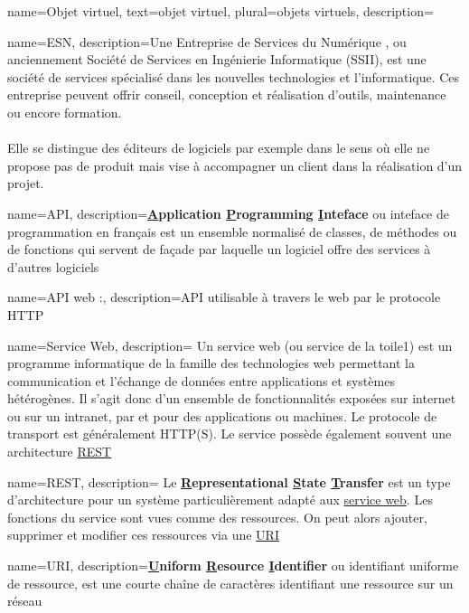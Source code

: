 {
    name=Objet virtuel,
    text=objet virtuel,
    plural=objets virtuels,
    description={}
}

{
	name=ESN,
    description={Une Entreprise de Services du Numérique , ou anciennement Société de Services en Ingénierie Informatique (SSII), est une société de services spécialisé dans les nouvelles technologies et l’informatique. Ces entreprise peuvent offrir conseil, conception et réalisation d’outils, maintenance ou encore formation.\\\\
    Elle se distingue des éditeurs de logiciels par exemple dans le sens où elle ne propose pas de produit mais vise à accompagner un client dans la réalisation d'un projet.}
}

{
    name=API,
    description={\textbf{\underline{A}pplication \underline{P}rogramming \underline{I}nteface} ou inteface de programmation en français est un ensemble normalisé de classes, de méthodes ou de fonctions qui servent de façade par laquelle un logiciel offre des services à d'autres logiciels}
}

{
    name=API web :,
    description={\gls{API} utilisable à travers le web par le protocole HTTP}
}

{
    name=Service Web,
    description=
    {
        Un service web (ou service de la toile1) est un programme informatique de la famille des technologies web permettant la communication et l'échange de données entre applications et systèmes hétérogènes.
        Il s'agit donc d'un ensemble de fonctionnalités exposées sur internet ou sur un intranet, par et pour des applications ou machines.
        Le protocole de transport est généralement HTTP(S). Le service possède également souvent une architecture \underline{\gls{REST}}
    }
}

{
    name=REST,
    description=
    {
        Le \textbf{\underline{R}epresentational \underline{S}tate \underline{T}ransfer} est un type d'architecture pour un système particulièrement adapté aux \underline{\gls{service web}}. Les fonctions du service sont vues comme des ressources. On peut alors ajouter, supprimer et modifier ces ressources via une \underline{\gls{URI}}
    }
}

{
    name=URI,
    description={\textbf{\underline{U}niform \underline{R}esource \underline{I}dentifier} ou identifiant uniforme de ressource, est une courte chaîne de caractères identifiant une ressource sur un réseau}
}

